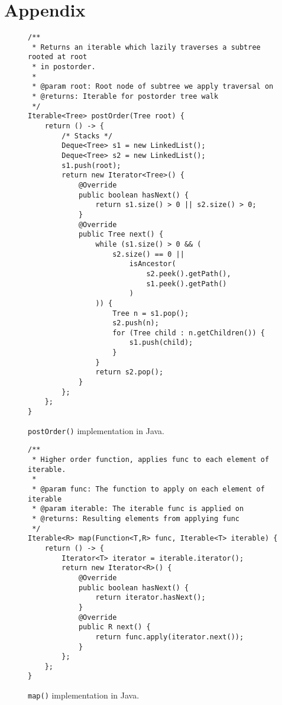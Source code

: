 \documentclass[abstracton,12pt]{scrartcl}
\theoremstyle{definition}
\begin{document}
\newpage




\newpage

\section{Appendix}

\begin{figure}[H]
  \centering
  \small
  \begin{framed}
\begin{verbatim}
/**
 * Returns an iterable which lazily traverses a subtree rooted at root
 * in postorder.
 *
 * @param root: Root node of subtree we apply traversal on
 * @returns: Iterable for postorder tree walk
 */
Iterable<Tree> postOrder(Tree root) {
    return () -> {
        /* Stacks */
        Deque<Tree> s1 = new LinkedList();
        Deque<Tree> s2 = new LinkedList();
        s1.push(root);
        return new Iterator<Tree>() {
            @Override
            public boolean hasNext() {
                return s1.size() > 0 || s2.size() > 0;
            }
            @Override
            public Tree next() {
                while (s1.size() > 0 && (
                    s2.size() == 0 ||
                        isAncestor(
                            s2.peek().getPath(),
                            s1.peek().getPath()
                        )
                )) {
                    Tree n = s1.pop();
                    s2.push(n);
                    for (Tree child : n.getChildren()) {
                        s1.push(child);
                    }
                }
                return s2.pop();
            }          
        };
    };
}
\end{verbatim}
  \end{framed}
  \caption[\texttt{postOrder()} implementation in Java]{
  \texttt{postOrder()} implementation in Java.}
  \label{fig:java_postorder}
\end{figure}

\begin{figure}[h]
  \begin{framed}
\begin{verbatim}
/**
 * Higher order function, applies func to each element of iterable.
 *
 * @param func: The function to apply on each element of iterable
 * @param iterable: The iterable func is applied on
 * @returns: Resulting elements from applying func
 */
Iterable<R> map(Function<T,R> func, Iterable<T> iterable) {
    return () -> {
        Iterator<T> iterator = iterable.iterator();
        return new Iterator<R>() {
            @Override
            public boolean hasNext() {
                return iterator.hasNext();
            }
            @Override
            public R next() {
                return func.apply(iterator.next());
            }
        };
    };
}
\end{verbatim}
  \end{framed}
  \caption[\texttt{map()} implementation in Java]{\texttt{map()} implementation in Java.}
  \label{fig:java_map}
\end{figure}
\end{document}
